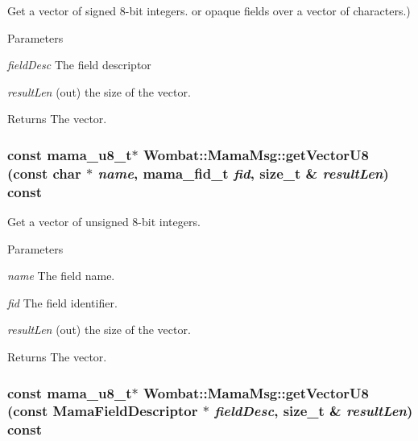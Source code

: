 Get a vector of signed 8-\/bit integers. or opaque fields over a vector of characters.) 
\begin{DoxyParams}{Parameters}
\item[{\em fieldDesc}]The field descriptor \item[{\em resultLen}](out) the size of the vector. \end{DoxyParams}
\begin{DoxyReturn}{Returns}
The vector. 
\end{DoxyReturn}
\hypertarget{classWombat_1_1MamaMsg_ac47f96489957fe9338bf26fbc13c51fe}{
\subsubsection[{getVectorU8}]{\setlength{\rightskip}{0pt plus 5cm}const mama\_\-u8\_\-t$\ast$ Wombat::MamaMsg::getVectorU8 (const char $\ast$ {\em name}, \/  mama\_\-fid\_\-t {\em fid}, \/  size\_\-t \& {\em resultLen}) const}}
\label{classWombat_1_1MamaMsg_ac47f96489957fe9338bf26fbc13c51fe}


Get a vector of unsigned 8-\/bit integers. 
\begin{DoxyParams}{Parameters}
\item[{\em name}]The field name. \item[{\em fid}]The field identifier. \item[{\em resultLen}](out) the size of the vector. \end{DoxyParams}
\begin{DoxyReturn}{Returns}
The vector. 
\end{DoxyReturn}
\hypertarget{classWombat_1_1MamaMsg_a14fb3ec53d33e1f7d85bc8fa1eb84e63}{
\subsubsection[{getVectorU8}]{\setlength{\rightskip}{0pt plus 5cm}const mama\_\-u8\_\-t$\ast$ Wombat::MamaMsg::getVectorU8 (const {\bf MamaFieldDescriptor} $\ast$ {\em fieldDesc}, \/  size\_\-t \& {\em resultLen}) const}}
\label{classWombat_1_1MamaMsg_a14fb3ec53d33e1f7d85bc8fa1eb84e63}


